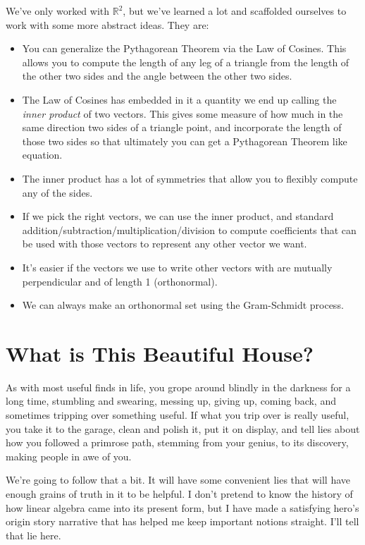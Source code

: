 \documentclass[
]{book}
\providecommand{\tightlist}{%
  \setlength{\itemsep}{0pt}\setlength{\parskip}{0pt}}
\begin{document}
We've only worked with \(\mathbb{R}^2\), but we've learned a lot and scaffolded ourselves to work with some more abstract ideas. They are:

\begin{itemize}
\tightlist
\item
  You can generalize the Pythagorean Theorem via the Law of Cosines. This allows you to compute the length of any leg of a triangle from the length of the other two sides and the angle between the other two sides.
\item
  The Law of Cosines has embedded in it a quantity we end up calling the \emph{inner product} of two vectors. This gives some measure of how much in the same direction two sides of a triangle point, and incorporate the length of those two sides so that ultimately you can get a Pythagorean Theorem like equation.
\item
  The inner product has a lot of symmetries that allow you to flexibly compute any of the sides.
\item
  If we pick the right vectors, we can use the inner product, and standard addition/subtraction/multiplication/division to compute coefficients that can be used with those vectors to represent any other vector we want.
\item
  It's easier if the vectors we use to write other vectors with are mutually perpendicular and of length 1 (orthonormal).
\item
  We can always make an orthonormal set using the Gram-Schmidt process.
\end{itemize}

\hypertarget{what-is-this-beautiful-house}{%
\chapter{What is This Beautiful House?}\label{what-is-this-beautiful-house}}

As with most useful finds in life, you grope around blindly in the darkness for a long time, stumbling and swearing, messing up, giving up, coming back, and sometimes tripping over something useful. If what you trip over is really useful, you take it to the garage, clean and polish it, put it on display, and tell lies about how you followed a primrose path, stemming from your genius, to its discovery, making people in awe of you.

We're going to follow that a bit. It will have some convenient lies that will have enough grains of truth in it to be helpful. I don't pretend to know the history of how linear algebra came into its present form, but I have made a satisfying hero's origin story narrative that has helped me keep important notions straight. I'll tell that lie here.
\end{document}
